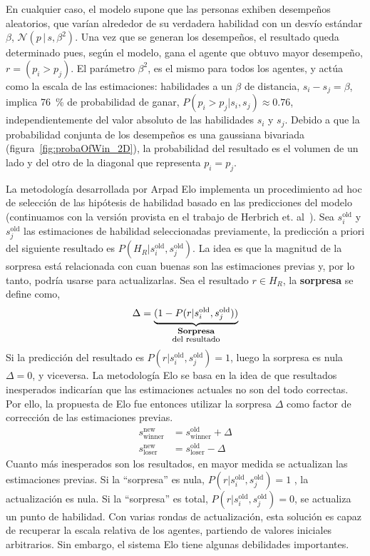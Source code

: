 \documentclass[a4paper,11pt]{book}
\newcommand{\N}{\mathcal{N}}
\newcommand\hfrac[2]{\genfrac{}{}{0pt}{}{#1}{#2}} %
\theoremstyle{definition}
\begin{document}
%
En cualquier caso, el modelo supone que las personas exhiben desempe\~nos aleatorios, que var\'ian alrededor de su verdadera habilidad con un desv\'io est\'andar $\beta$, $\N(p\,|\,s,\beta^2)$.
%
Una vez que se generan los desempe\~nos, el resultado queda determinado pues, seg\'un el modelo, gana el agente que obtuvo mayor desempe\~no, $r = (p_i > p_j)$.
%
El par\'ametro $\beta^2$, es el mismo para todos los agentes, y act\'ua como la escala de las estimaciones: habilidades a un $\beta$ de distancia, $s_i-s_j=\beta$, implica \SI{76}{\percent} de probabilidad de ganar, $P(p_i > p_j|s_i,s_j)\approx0.76$, independientemente del valor absoluto de las habilidades $s_i$ y $s_j$.
%
Debido a que la probabilidad conjunta de los desempe\~nos es una gaussiana bivariada (figura~\ref{fig:probaOfWin_2D}), la probabilidad del resultado es el volumen de un lado y del otro de la diagonal que representa $p_i=p_j$.


La metodolog\'ia desarrollada por Arpad Elo implementa un procedimiento ad hoc de selecci\'on de las hip\'otesis de habilidad basado en las predicciones del modelo (continuamos con la versi\'on provista en el trabajo de Herbrich et. al~\cite{Herbrich2007}).
%
Sea $s_i^{\text{old}}$ y $s_j^{\text{old}}$ las estimaciones de habilidad seleccionadas previamente, la predicci\'on a priori del siguiente resultado es $P(H_R|s_i^{\text{old}},s_j^{\text{old}})$.
%
La idea es que la magnitud de la sorpresa est\'a relacionada con cuan buenas son las estimaciones previas y, por lo tanto, podr\'ia usarse para actualizarlas.
%
Sea el resultado $r \in H_R$, la \textbf{sorpresa} se define como,
%
\begin{equation*}
 \Delta = \underbrace{(1 - P(r|s_i^{\text{old}},s_j^{\text{old}}))}_{\hfrac{\textbf{\footnotesize Sorpresa}}{\text{\footnotesize del resultado}}}
\end{equation*}
%
Si la predicción del resultado es $P(r|s_i^{\text{old}},s_j^{\text{old}}) = 1$, luego la sorpresa es nula $\Delta = 0$, y viceversa.
%
La metodolog\'ia Elo se basa en la idea de que resultados inesperados indicar\'ian que las estimaciones actuales no son del todo correctas.
%
Por ello, la propuesta de Elo fue entonces utilizar la sorpresa $\Delta$ como factor de correcci\'on de las estimaciones previas.
%
\begin{equation}\label{eq:elo_update}
\begin{split}
s_{\text{winner}}^{\text{new}} &= s_{\text{winner}}^{\text{old}} + \Delta \\
s_{\text{loser}}^{\text{new}} &= s_{\text{loser}}^{\text{old}} - \Delta
\end{split}
\end{equation}
%
Cuanto m\'as inesperados son los resultados, en mayor medida se actualizan las estimaciones previas.
%
Si la ``sorpresa'' es nula, $P(r|s_i^{\text{old}},s_j^{\text{old}})=1$ , la actualizaci\'on es nula.
%
Si la ``sorpresa'' es total, $P(r|s_i^{\text{old}},s_j^{\text{old}})=0$, se actualiza un punto de habilidad.
%
Con varias rondas de actualizaci\'on, esta soluci\'on es capaz de recuperar la escala relativa de los agentes, partiendo de valores iniciales arbitrarios.
%
Sin embargo, el sistema Elo tiene algunas debilidades importantes.
\end{document}
